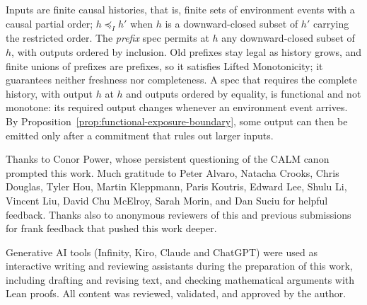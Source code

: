 \documentclass[sigconf]{cidr-2027}
\theoremstyle{remark}
\newcommand{\InputOrd}{\preceq_I}
\newcommand{\commitment}{commitment\xspace}
\begin{document}
\color{blue!70!black}Inputs are finite causal histories, that is, finite sets of environment events with a
causal partial order; $h\InputOrd h'$ when $h$ is a downward-closed subset of
$h'$ carrying the restricted order.  The \emph{prefix} spec permits
at $h$ any downward-closed subset of $h$, with outputs ordered by inclusion.
Old prefixes stay legal as history grows, and finite unions of prefixes are
prefixes, so it satisfies Lifted Monotonicity; it guarantees neither freshness
nor completeness.  A spec that requires the complete history, with
output $h$ at $h$ and outputs ordered by equality, is functional and not
monotone: its required output changes whenever an environment event arrives.  By
Proposition~\ref{prop:functional-exposure-boundary}, some output can then be
emitted only after a \commitment that rules out larger inputs.\color{black}

\begin{acks}
Thanks to Conor Power, whose persistent questioning of the CALM canon prompted this work.
Much gratitude to Peter Alvaro, Natacha Crooks, Chris Douglas, Tyler Hou, Martin
Kleppmann, Paris Koutris, Edward Lee, Shulu Li, Vincent Liu, David Chu McElroy,
Sarah Morin, and Dan Suciu for helpful feedback. Thanks also to
anonymous reviewers of this and previous submissions for frank feedback that pushed
this work deeper.

Generative AI tools (Infinity, Kiro, Claude and ChatGPT) were used as interactive writing and
reviewing assistants during the preparation of this work, including drafting
and revising text, and checking mathematical arguments with Lean proofs.  All
content was reviewed, validated, and approved by the author.
\end{acks}




\end{document}
